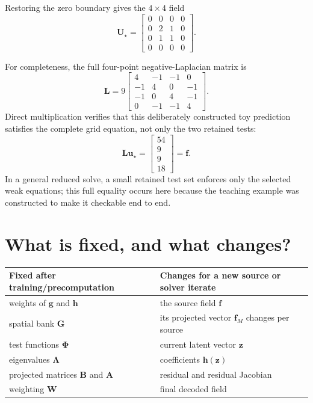 \documentclass[11pt]{article}
\newcommand{\mat}[1]{\mathbf{#1}}
\newcommand{\vect}[1]{\mathbf{#1}}
\begin{document}
Restoring the zero boundary gives the $4\times4$ field
\begin{equation}
  \mat{U}_\star
  =\begin{bmatrix}
      0&0&0&0\\
      0&2&1&0\\
      0&1&1&0\\
      0&0&0&0
    \end{bmatrix}.
\end{equation}

For completeness, the full four-point negative-Laplacian matrix is
\begin{equation}
  \mat{L}
  =9\begin{bmatrix}
      4&-1&-1&0\\
      -1&4&0&-1\\
      -1&0&4&-1\\
      0&-1&-1&4
    \end{bmatrix}.
\end{equation}
Direct multiplication verifies that this deliberately constructed toy
prediction satisfies the complete grid equation, not only the two retained
tests:
\begin{equation}
  \mat{L}\vect{u}_\star
  =\begin{bmatrix}54\\9\\9\\18\end{bmatrix}
  =\vect{f}.
\end{equation}
In a general reduced solve, a small retained test set enforces only the
selected weak equations; this full equality occurs here because the teaching
example was constructed to make it checkable end to end.

\section{What is fixed, and what changes?}

\begin{center}
\begin{tabular}{@{}>{\raggedright\arraybackslash}p{}
                    >{\raggedright\arraybackslash}p{}@{}}
\toprule
Fixed after training/precomputation & Changes for a new source or solver iterate \\
\midrule
weights of $\vect{g}$ and $\vect{h}$ & the source field $\vect{f}$ \\
spatial bank $\mat{G}$ & its projected vector $\vect{f}_M$ changes per source \\
test functions $\mat{\Phi}$ & current latent vector $\vect{z}$ \\
eigenvalues $\mat{\Lambda}$ & coefficients $\vect{h}(\vect{z})$ \\
projected matrices $\mat{B}$ and $\mat{A}$ & residual and residual Jacobian \\
weighting $\mat{W}$ & final decoded field \\
\bottomrule
\end{tabular}
\end{center}
\end{document}
